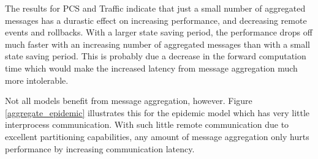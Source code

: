 \documentclass[11pt]{book}
\begin{document}
The results for PCS and Traffic indicate that just a small number of aggregated messages has
a durastic effect on increasing performance, and decreasing remote events and rollbacks. With
a larger state saving period, the performance drops off much faster with an increasing number
of aggregated messages than with a small state saving period. This is probably due a decrease
in the forward computation time which would make the increased latency from message aggregation
much more intolerable. 

Not all models benefit from message aggregation, however. Figure \ref{aggregate_epidemic}
illustrates this for the epidemic model which has very little interprocess communication.
With such little remote communication due to excellent partitioning capabilities, any amount
of message aggregation only hurts performance by increasing communication latency.
\end{document}
